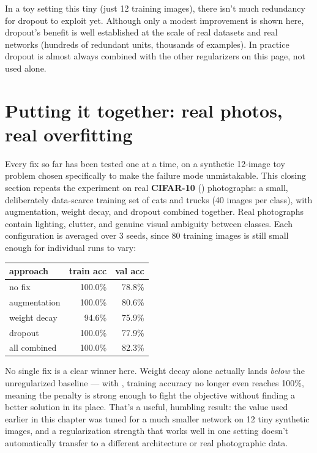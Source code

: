 In a toy setting this tiny (just 12 training images), there isn't much redundancy for dropout to exploit yet. Although only a modest improvement is shown here, dropout's benefit is well established at the scale of real datasets and real networks (hundreds of redundant units, thousands of examples). In practice dropout is almost always combined with the other regularizers on this page, not used alone.

\section{Putting it together: real photos, real overfitting}

Every fix so far has been tested one at a time, on a synthetic 12-image toy problem chosen specifically to make the failure mode unmistakable. This closing section repeats the experiment on real \textbf{CIFAR-10} () photographs: a small, deliberately data-scarce training set of cats and trucks (40 images per class), with augmentation, weight decay, and dropout combined together. Real photographs contain lighting, clutter, and genuine visual ambiguity between classes. Each configuration is averaged over 3 seeds, since 80 training images is still small enough for individual runs to vary:

\begin{center}
\renewcommand{\arraystretch}{1.3}
\begin{tabular}{lrr}
\hline
\textbf{approach} & \textbf{train acc} & \textbf{val acc} \\
\hline
no fix       & 100.0\% & 78.8\% \\
augmentation & 100.0\% & 80.6\% \\
weight decay & 94.6\%  & 75.9\% \\
dropout      & 100.0\% & 77.9\% \\
all combined & 100.0\% & 82.3\% \\
\hline
\end{tabular}
\end{center}

No single fix is a clear winner here. Weight decay alone actually lands \emph{below} the unregularized baseline --- with , training accuracy no longer even reaches 100\%, meaning the penalty is strong enough to fight the objective without finding a better solution in its place. That's a useful, humbling result: the  value used earlier in this chapter was tuned for a much smaller network on 12 tiny synthetic images, and a regularization strength that works well in one setting doesn't automatically transfer to a different architecture or real photographic data.

